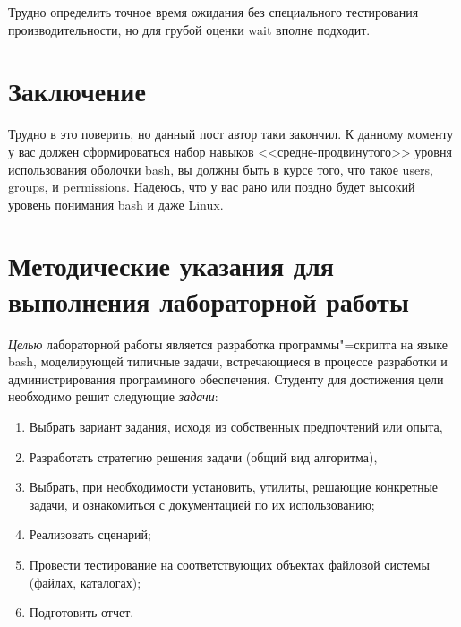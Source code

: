 \documentclass[12pt]{article}
\begin{document}
Трудно определить точное время ожидания без специального тестирования
производительности, но для грубой оценки wait вполне подходит.

\hypertarget{Conclusion}{%
  \section*{\texorpdfstring{\protect\hyperlink{Conclusion}{}Заключение}{Заключение}}\label{Conclusion}}

Трудно в это поверить, но данный пост автор таки закончил. К данному
моменту у вас должен сформироваться набор навыков <<средне-продвинутого>> уровня использования оболочки bash, вы должны быть в курсе
того, что такое \href{blog/2019/user-permissions/}{users, groups, и
permissions}. Надеюсь, что у вас рано или поздно будет высокий уровень
понимания bash и даже Linux.

\section{Методические указания для выполнения лабораторной работы}

\emph{Целью} лабораторной работы является разработка программы"=скрипта на языке bash, моделирующей типичные задачи, встречающиеся в процессе разработки и администрирования программного обеспечения. Студенту для достижения цели необходимо решит следующие \emph{задачи}:
\begin{enumerate}
\item Выбрать вариант задания, исходя из собственных предпочтений или опыта,
\item Разработать стратегию решения задачи (общий вид алгоритма),
\item Выбрать, при необходимости установить, утилиты, решающие конкретные задачи, и ознакомиться с документацией по их использованию;
\item Реализовать сценарий;
\item Провести тестирование на соответствующих объектах файловой системы (файлах, каталогах);
\item Подготовить отчет.
\end{enumerate}
\end{document}
